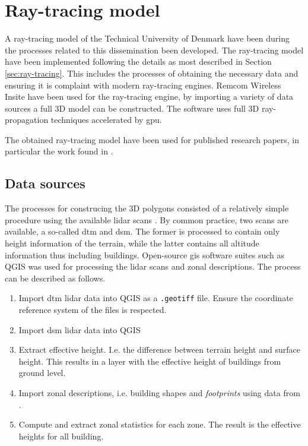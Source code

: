 \chapter{Ray-tracing model}\label{app:ray_tracing_model}

A ray-tracing model of the Technical University of Denmark have been during the processes related to this dissemination been developed. The ray-tracing model have been implemented following the details as most described in Section \ref{sec:ray-tracing}. This includes the processes of obtaining the necessary data and ensuring it is complaint with modern ray-tracing engines. Remcom Wireless Insite have been used for the ray-tracing engine, by importing a variety of data sources a full 3D model can be constructed. The software uses full 3D ray-propagation techniques accelerated by \gls{gpu}.

The obtained ray-tracing model have been used for published research papers, in particular the work found in \cite{Thrane2019ComparisonGHz, Thrane020ModelAidedDeepLearning, Thrane2020DeepKnowledge}.

\section{Data sources}

The processes for construcing the 3D polygons consisted of a relatively simple procedure using the available \gls{lidar} scans \cite{kortforsyningen}. By common practice, two scans are available, a so-called \gls{dtm} and \gls{dsm}. The former is processed to contain only height information of the terrain, while the latter contains all altitude information thus including buildings. Open-source \gls{gis} software suites such as QGIS \cite{QGISDevelopmentTeam2020QGISSystem} was used for processing the \gls{lidar} scans and zonal descriptions. The process can be described as follows. 
\begin{enumerate}
    \item Import \gls{dtm} \gls{lidar} data into QGIS as a \texttt{.geotiff} file. Ensure the coordinate reference system of the files is respected.
    \item Import \gls{dsm} \gls{lidar} data into QGIS
    \item Extract effective height. I.e. the difference between terrain height and surface height. This results in a layer with the effective height of buildings from ground level.
    \item Import zonal descriptions, i.e. building shapes and \emph{footprints} using data from \cite{OpenstreetMapWiki}.
    \item Compute and extract zonal statistics for each zone. The result is the effective heights for all building.
\end{enumerate}

